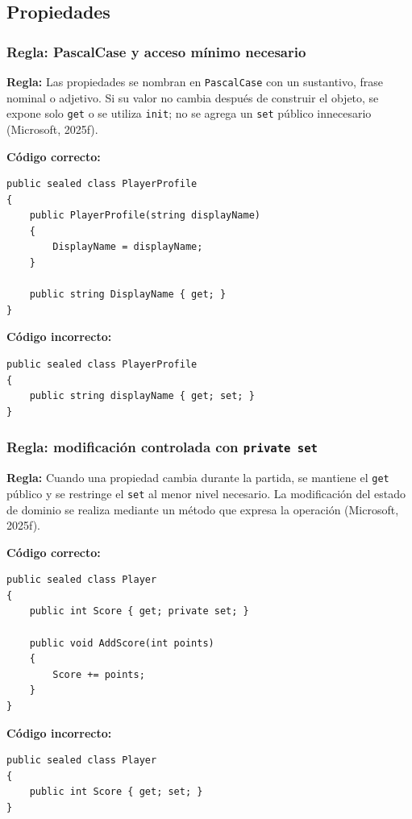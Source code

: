 \subsection{Propiedades}

\subsubsection{Regla: PascalCase y acceso mínimo necesario}

\textbf{Regla:} Las propiedades se nombran en \texttt{PascalCase} con un sustantivo, frase nominal o adjetivo. Si su valor no cambia después de construir el objeto, se expone solo \texttt{get} o se utiliza \texttt{init}; no se agrega un \texttt{set} público innecesario (Microsoft, 2025f).

\textbf{Código correcto:}
\begin{lstlisting}[style=csharpstyle]
public sealed class PlayerProfile
{
    public PlayerProfile(string displayName)
    {
        DisplayName = displayName;
    }

    public string DisplayName { get; }
}
\end{lstlisting}

\textbf{Código incorrecto:}
\begin{lstlisting}[style=csharpstyle]
public sealed class PlayerProfile
{
    public string displayName { get; set; }
}
\end{lstlisting}

\subsubsection{Regla: modificación controlada con \texttt{private set}}

\textbf{Regla:} Cuando una propiedad cambia durante la partida, se mantiene el \texttt{get} público y se restringe el \texttt{set} al menor nivel necesario. La modificación del estado de dominio se realiza mediante un método que expresa la operación (Microsoft, 2025f).

\textbf{Código correcto:}
\begin{lstlisting}[style=csharpstyle]
public sealed class Player
{
    public int Score { get; private set; }

    public void AddScore(int points)
    {
        Score += points;
    }
}
\end{lstlisting}

\textbf{Código incorrecto:}
\begin{lstlisting}[style=csharpstyle]
public sealed class Player
{
    public int Score { get; set; }
}
\end{lstlisting}

